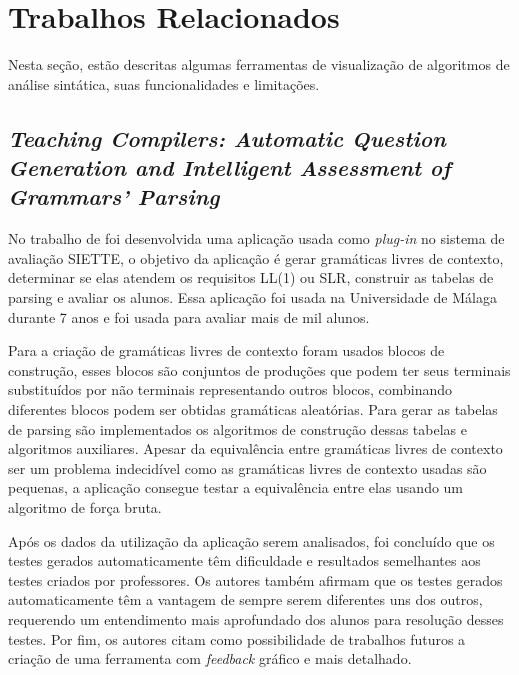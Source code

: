 \chapter{Trabalhos Relacionados}
\label{cap:trabalhos-relacionados}

Nesta seção, estão descritas algumas ferramentas de visualização de algoritmos de análise sintática, suas funcionalidades e limitações.

\section{\textit{Teaching Compilers: Automatic Question Generation and Intelligent Assessment of Grammars' Parsing}}
No trabalho de \textcite{munozquestions} foi desenvolvida uma aplicação usada como \textit{plug-in} no sistema de avaliação SIETTE, o objetivo da aplicação é gerar gramáticas livres de contexto, determinar se elas atendem os requisitos LL(1) ou SLR, construir as tabelas de parsing e avaliar os alunos. Essa aplicação foi usada na Universidade de Málaga durante 7 anos e foi usada para avaliar mais de mil alunos.

Para a criação de gramáticas livres de contexto foram usados blocos de construção, esses blocos são conjuntos de produções que podem ter seus terminais substituídos por não terminais representando outros blocos, combinando diferentes blocos podem ser obtidas gramáticas aleatórias. Para gerar as tabelas de parsing são implementados os algoritmos de construção dessas tabelas e algoritmos auxiliares. Apesar da equivalência entre gramáticas livres de contexto ser um problema indecidível como as gramáticas livres de contexto usadas são pequenas, a aplicação consegue testar a equivalência entre elas usando um algoritmo de força bruta.

Após os dados da utilização da aplicação serem analisados, foi concluído que os testes gerados automaticamente têm dificuldade e resultados semelhantes aos testes criados por professores. Os autores também afirmam que os testes gerados automaticamente têm a vantagem de sempre serem diferentes uns dos outros, requerendo um entendimento mais aprofundado dos alunos para resolução desses testes. Por fim, os autores citam como possibilidade de trabalhos futuros a criação de uma ferramenta com \textit{feedback} gráfico e mais detalhado.


